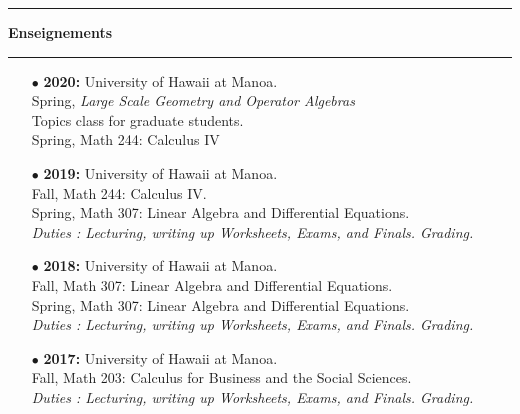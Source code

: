 \documentclass[a4paper,11pt]{article}
\newcommand{\titre}[1]{%
	\begin{center}
	\bigskip
	\rule{\textwidth}{1pt}
	\par\vspace{0.1cm}
        \textbf{\large #1}
	\par\rule{\textwidth}{1pt}
	\end{center}
	\bigskip
	}
\begin{document}
\titre{Enseignements}

\begin{itemize}

\item[$\bullet$] \textbf{2020:} University of Hawaii at Manoa.\\
				Spring, \textit{Large Scale Geometry and Operator Algebras}\\
				Topics class for graduate students.\\
				Spring, Math 244: Calculus IV\\
\item[$\bullet$] \textbf{2019:} University of Hawaii at Manoa.\\
					Fall, Math 244: Calculus IV.\\
					Spring, Math 307: Linear Algebra and Differential Equations.\\
					\textit{Duties : Lecturing, writing up Worksheets, Exams, and Finals. Grading.}\\

\item[$\bullet$] \textbf{2018:} University of Hawaii at Manoa.\\
					Fall, Math 307: Linear Algebra and Differential Equations.\\
					Spring, Math 307: Linear Algebra and Differential Equations.\\
					\textit{Duties : Lecturing, writing up Worksheets, Exams, and Finals. Grading.}\\

\item[$\bullet$] \textbf{2017:} University of Hawaii at Manoa.\\
					Fall, Math 203: Calculus for Business and the Social Sciences.\\
					\textit{Duties : Lecturing, writing up Worksheets, Exams, and Finals. Grading.}\\


\end{itemize}
\end{document}
